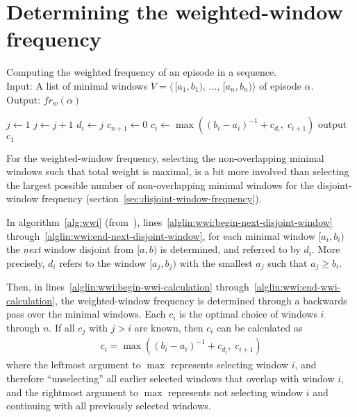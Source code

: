 \section{Determining the weighted-window frequency}

\begin{algorithm}

\caption{Computing the weighted frequency of an episode in a sequence.\\
Input: A list of minimal windows $ V = \langle \, [a_1, b_1), \, \ldots, \, [a_n, b_n) \rangle $ of episode $ \alpha $.\\
Output: $ fr_w(\alpha) $
}

\begin{algorithmic}[1]

\State $ j \gets 1 $
\ForAll {$ [a_i, b_i) \in V $} \label{alglin:wwi:begin-next-disjoint-window}
        \State $ j \gets j + 1 $
    \EndWhile
    \State $ d_i \gets j $ \label{alglin:wwi:end-next-disjoint-window}
\EndFor
\State $ c_{n + 1} \gets 0 $ \label{alglin:wwi:begin-wwi-calculation}
    \State $ c_i \gets \max((b_i - a_i)^{-1} + c_{d_i}, \; c_{i+1}) $ \label{alglin:wwi:end-wwi-calculation}
\EndFor
\State output $ c_1 $

\end{algorithmic}

\label{alg:wwi}
\end{algorithm}

For the weighted-window frequency, selecting the non-overlapping minimal windows such that total weight is maximal, is a bit more involved than selecting the largest possible number of non-overlapping minimal windows for the disjoint-window frequency (section~\ref{sec:disjoint-window-frequency}).

In algorithm~\ref{alg:wwi} (from~\cite{cule2014marbles}), lines~\ref{alglin:wwi:begin-next-disjoint-window} through~\ref{alglin:wwi:end-next-disjoint-window}, for each minimal window $ [a_i, b_i) $ the \emph{next} window disjoint from $ [a, b) $ is determined, and referred to by $ d_i $. More precisely, $ d_i $ refers to the window $ [a_j, b_j) $ with the smallest $ a_j $ such that $ a_j \geq b_i $.

Then, in lines~\ref{alglin:wwi:begin-wwi-calculation} through~\ref{alglin:wwi:end-wwi-calculation}, the weighted-window frequency is determined through a backwards pass over the minimal windows. Each $ c_i $ is the optimal choice of windows $ i $ through $ n $. If all $ c_j $ with $ j > i $ are known, then $ c_i $ can be calculated as
\begin{align*}
c_i = \max((b_i - a_i)^{-1} + c_{d_i}, \; c_{i+1})
\end{align*}
where the leftmost argument to $ \max $ represents selecting window $ i $, and therefore ``unselecting'' all earlier selected windows that overlap with window $ i $, and the rightmost argument to $ \max $ represents not selecting window $ i $ and continuing with all previously selected windows.

